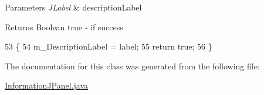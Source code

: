 \begin{DoxyParams}{Parameters}
{\em J\-Label} & description\-Label \\
\hline
\end{DoxyParams}
\begin{DoxyReturn}{Returns}
Boolean true -\/ if success 
\end{DoxyReturn}

\begin{DoxyCode}
53                                                      \{ 
54         m\_DescriptionLabel = label;
55         \textcolor{keywordflow}{return} \textcolor{keyword}{true}; 
56     \}
\end{DoxyCode}


The documentation for this class was generated from the following file\-:\begin{DoxyCompactItemize}
\item 
\hyperlink{_information_j_panel_8java}{Information\-J\-Panel.\-java}\end{DoxyCompactItemize}
